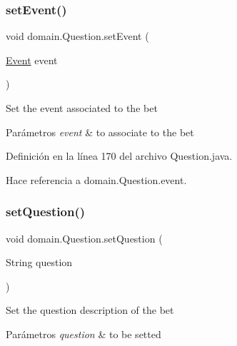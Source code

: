 \subsubsection{\texorpdfstring{setEvent()}{setEvent()}}
{\footnotesize\ttfamily void domain.\+Question.\+set\+Event (\begin{DoxyParamCaption}\item[{\mbox{\hyperlink{classdomain_1_1Event}{Event}}}]{event }\end{DoxyParamCaption})}

Set the event associated to the bet


\begin{DoxyParams}{Parámetros}
{\em event} & to associate to the bet \\
\hline
\end{DoxyParams}


Definición en la línea 170 del archivo Question.\+java.


\begin{DoxyCode}{0}

\end{DoxyCode}


Hace referencia a domain.\+Question.\+event.

\mbox{\label{classdomain_1_1Question_a612ee55b9eac9032980063ddb1119eee}} 
\subsubsection{\texorpdfstring{setQuestion()}{setQuestion()}}
{\footnotesize\ttfamily void domain.\+Question.\+set\+Question (\begin{DoxyParamCaption}\item[{String}]{question }\end{DoxyParamCaption})}

Set the question description of the bet


\begin{DoxyParams}{Parámetros}
{\em question} & to be setted \\
\hline
\end{DoxyParams}


